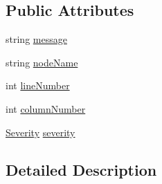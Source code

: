 \subsection*{Public Attributes}
\begin{DoxyCompactItemize}
\item 
string \hyperlink{a00035_ac7ed070dddd2613c08e7874ea5afb3af}{message}
\item 
string \hyperlink{a00035_a662aca4ad2af5116c2cf6773daf1a847}{node\-Name}
\item 
int \hyperlink{a00035_a0bd73f1c684bfd66ae7b6bef8f2972d0}{line\-Number}
\item 
int \hyperlink{a00035_a658e7fb05555c0f9ab5f80057bdc1408}{column\-Number}
\item 
\hyperlink{a00035_a227813cbc8fa03c3448a612ffc909d1c}{Severity} \hyperlink{a00035_ad90ffa839ce0f568a099bb37b4a6c4da}{severity}
\end{DoxyCompactItemize}


\subsection{Detailed Description}


